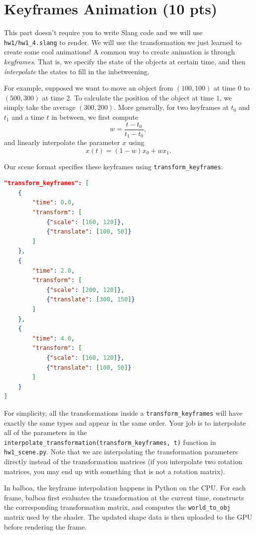 \section{Keyframes Animation (10 pts)}

This part doesn't require you to write Slang code and we will use \lstinline{hw1/hw1_4.slang} to render. We will use the transformation we just learned to create some cool animations! A common way to create animation is through \emph{keyframes}. That is, we specify the state of the objects at certain time, and then \emph{interpolate} the states to fill in the inbetweening. 

For example, supposed we want to move an object from $(100, 100)$ at time $0$ to $(500, 300)$ at time $2$. To calculate the position of the object at time $1$, we simply take the average $(300, 200)$. More generally, for two keyframes at $t_0$ and $t_1$ and a time $t$ in between, we first compute
\begin{equation}
    w = \frac{t - t_0}{t_1 - t_0},
\end{equation}
and linearly interpolate the parameter $x$ using
\begin{equation}
    x(t) = (1-w) x_0 + w x_1.
\end{equation}

Our scene format specifies these keyframes using \lstinline{transform_keyframes}:
\begin{lstlisting}[language=json]
"transform_keyframes": [
    {
        "time": 0.0,
        "transform": [
            {"scale": [160, 120]},
            {"translate": [100, 50]}
        ]
    },
    {
        "time": 2.0,
        "transform": [
            {"scale": [200, 120]},
            {"translate": [300, 150]}
        ]
    },
    {
        "time": 4.0,
        "transform": [
            {"scale": [160, 120]},
            {"translate": [100, 50]}
        ]
    }
]
\end{lstlisting}

For simplicity, all the transformations inside a \lstinline{transform_keyframes} will have exactly the same types and appear in the same order.
Your job is to interpolate all of the parameters in the \lstinline{interpolate_transformation(transform_keyframes, t)} function in \lstinline{hw1_scene.py}.
Note that we are interpolating the transformation parameters directly instead of the transformation matrices (if you interpolate two rotation matrices, you may end up with something that is not a rotation matrix).

In balboa, the keyframe interpolation happens in Python on the CPU. For each frame, balboa first evaluates the transformation at the current time, constructs the corresponding transformation matrix, and computes the \lstinline{world_to_obj} matrix used by the shader. The updated shape data is then uploaded to the GPU before rendering the frame.

